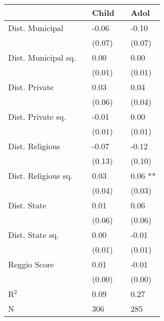 \begin{tabular}{l L{1cm} l L{1cm} l}
\toprule
 & & Child & & Adol \\
\midrule
Dist. Municipal & & -0.06 & & -0.10 \\
& & (0.07) & & (0.07) \\[5pt]
Dist. Municipal sq. & & 0.00 & & 0.00 \\
& & (0.01) & & (0.01) \\[5pt]
Dist. Private & & 0.03 & & 0.04 \\
& & (0.06) & & (0.04) \\[5pt]
Dist. Private sq. & & -0.01 & & 0.00 \\
& & (0.01) & & (0.01) \\[5pt]
Dist. Religious & & -0.07 & & -0.12 \\
& & (0.13) & & (0.10) \\[5pt]
Dist. Religious sq. & & 0.03 & & 0.06 ** \\
& & (0.04) & & (0.03) \\[5pt]
Dist. State & & 0.01 & & 0.06 \\
& & (0.06) & & (0.06) \\[5pt]
Dist. State sq. & & 0.00 & & -0.01 \\
& & (0.01) & & (0.01) \\[5pt]
Reggio Score & & 0.01 & & -0.01 \\
& & (0.00) & & (0.00) \\[5pt]
\midrule
R$^2$ & & 0.09 & & 0.27 \\
N & & 306 & & 285 \\
\bottomrule
\end{tabular}
